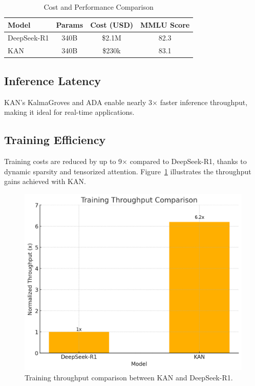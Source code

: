 \documentclass[twocolumn]{article}
\begin{document}
\begin{table}[h]
\centering
\caption{Cost and Performance Comparison}
\label{tab:results}
\begin{tabular}{lccc}
\toprule
\textbf{Model} & \textbf{Params} & \textbf{Cost (USD)} & \textbf{MMLU Score} \\
\midrule
DeepSeek-R1 & 340B & \$2.1M & 82.3 \\
KAN & 340B & \$230k & 83.1 \\
\bottomrule
\end{tabular}
\end{table}

\subsection{Inference Latency}
KAN's KalmaGroves and ADA enable nearly 3$\times$ faster inference throughput, making it ideal for real-time applications.

\subsection{Training Efficiency}
Training costs are reduced by up to 9$\times$ compared to DeepSeek-R1, thanks to dynamic sparsity and tensorized attention. Figure~\ref{fig:training} illustrates the throughput gains achieved with KAN.

\begin{figure}[h]
\centering
\includegraphics[width=0.9\linewidth]{training_efficiency.png}
\caption{Training throughput comparison between KAN and DeepSeek-R1.}
\label{fig:training}
\end{figure}
\end{document}
